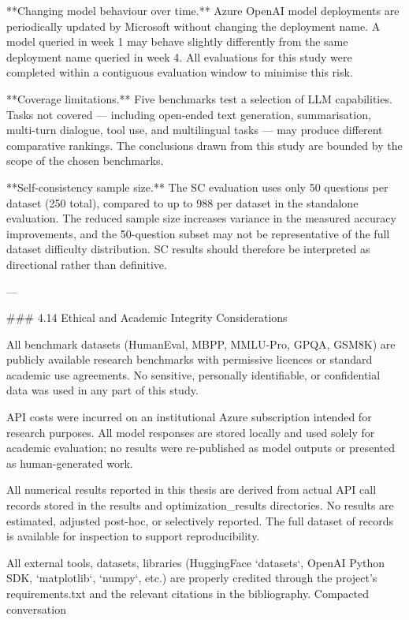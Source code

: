 **Changing model behaviour over time.** Azure OpenAI model deployments are periodically updated by Microsoft without changing the deployment name. A model queried in week 1 may behave slightly differently from the same deployment name queried in week 4. All evaluations for this study were completed within a contiguous evaluation window to minimise this risk.

**Coverage limitations.** Five benchmarks test a selection of LLM capabilities. Tasks not covered — including open-ended text generation, summarisation, multi-turn dialogue, tool use, and multilingual tasks — may produce different comparative rankings. The conclusions drawn from this study are bounded by the scope of the chosen benchmarks.

**Self-consistency sample size.** The SC evaluation uses only 50 questions per dataset (250 total), compared to up to 988 per dataset in the standalone evaluation. The reduced sample size increases variance in the measured accuracy improvements, and the 50-question subset may not be representative of the full dataset difficulty distribution. SC results should therefore be interpreted as directional rather than definitive.

---

### 4.14 Ethical and Academic Integrity Considerations

All benchmark datasets (HumanEval, MBPP, MMLU-Pro, GPQA, GSM8K) are publicly available research benchmarks with permissive licences or standard academic use agreements. No sensitive, personally identifiable, or confidential data was used in any part of this study.

API costs were incurred on an institutional Azure subscription intended for research purposes. All model responses are stored locally and used solely for academic evaluation; no results were re-published as model outputs or presented as human-generated work.

All numerical results reported in this thesis are derived from actual API call records stored in the results and optimization_results directories. No results are estimated, adjusted post-hoc, or selectively reported. The full dataset of records is available for inspection to support reproducibility.

All external tools, datasets, libraries (HuggingFace `datasets`, OpenAI Python SDK, `matplotlib`, `numpy`, etc.) are properly credited through the project's requirements.txt and the relevant citations in the bibliography. Compacted conversation


